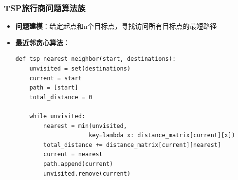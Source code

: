 \documentclass[12pt,a4paper]{article}
\begin{document}
\subsubsection{TSP旅行商问题算法族}
\begin{itemize}
    \item \textbf{问题建模}：给定起点和n个目标点，寻找访问所有目标点的最短路径
    \item \textbf{最近邻贪心算法}：
    \begin{verbatim}
def tsp_nearest_neighbor(start, destinations):
    unvisited = set(destinations)
    current = start
    path = [start]
    total_distance = 0
    
    while unvisited:
        nearest = min(unvisited, 
                     key=lambda x: distance_matrix[current][x])
        total_distance += distance_matrix[current][nearest]
        current = nearest
        path.append(current)
        unvisited.remove(current)
    

\end{verbatim}
\end{itemize}
\end{document}
